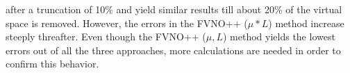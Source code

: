 after a truncation of 10\% and yield similar results till about 20\% of the virtual space is removed.
However, the errors in the FVNO++ ($\mu * L$) method increase steeply threafter. Even though 
the FVNO++ ($\mu,L$) method yields the lowest errors out of all the three approaches, more
calculations are needed in order to confirm this behavior.

